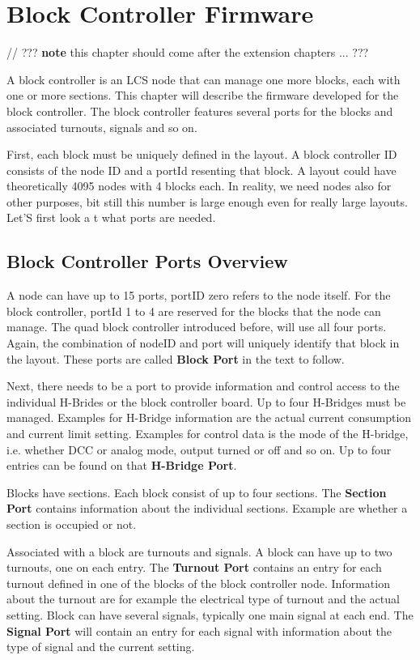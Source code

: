 \chapter{Block Controller Firmware}

// ??? \textbf{note} this chapter should come after the extension chapters ... ???

A block controller is an LCS node that can manage one more blocks, each with one or more sections. This chapter will describe the firmware developed for the block controller. The block controller features several ports for the blocks and associated turnouts, signals and so on.

First, each block must be uniquely defined in the layout. A block controller ID consists of the node ID and a portId resenting that block. A layout could have theoretically 4095 nodes with 4 blocks each. In reality, we need nodes also for other purposes, bit still this number is large enough even for really large layouts. Let'S first look a t what ports are needed.

\section{Block Controller Ports Overview}

A node can have up to 15 ports, portID zero refers to the node itself. For the block controller, portId 1 to 4 are reserved for the blocks that the node can manage. The quad block controller introduced before, will use all four ports. Again, the combination of nodeID and port will uniquely identify that block in the layout. These ports are called \textbf{Block Port} in the text to follow.

Next, there needs to be a port to provide information and control access to the individual H-Brides or the block controller board. Up to four H-Bridges must be managed. Examples for H-Bridge information are the actual current consumption and current limit setting. Examples for control data is the mode of the H-bridge, i.e. whether DCC or analog mode, output turned or off and so on. Up to four entries can be found on that \textbf{H-Bridge Port}.

Blocks have sections. Each block consist of up to four sections. The \textbf{Section Port} contains information about the individual sections. Example are whether a section is occupied or not.

Associated with a block are turnouts and signals. A block can have up to two turnouts, one on each entry. The \textbf{Turnout Port} contains an entry for each turnout defined in one of the blocks of the block controller node. Information about the turnout are for example the electrical type of turnout and the actual setting. Block can have several signals, typically one main signal at each end. The \textbf{Signal Port} will contain an entry for each signal with information about the  type of signal and the current setting.

